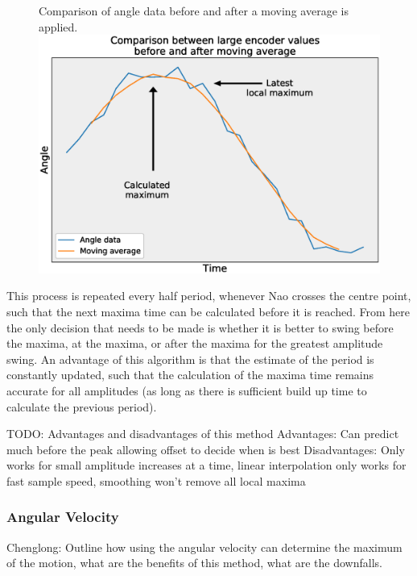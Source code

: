 \documentclass[11pt]{article}
\begin{document}
    \begin{figure}[!htb]
        \centering
        \captionbox
             {Comparison of angle data before and after a moving average is applied.\label{MovingAverageDiagram}}
             {\includegraphics[width=1.0\textwidth]{MovingAverageDiagram.eps}}
    \end{figure}


This process is repeated every half period, whenever Nao crosses the centre point, such that the next maxima time can be calculated before it is reached. From here the only decision that needs to be made is whether it is better to swing before the maxima, at the maxima, or after the maxima for the greatest amplitude swing. An advantage of this algorithm is that the estimate of the period is constantly updated, such that the calculation of the maxima time remains accurate for all amplitudes (as long as there is sufficient build up time to calculate the previous period).

TODO: Advantages and disadvantages of this method
Advantages: Can predict much before the peak allowing offset to decide when is best  
Disadvantages: Only works for small amplitude increases at a time, linear interpolation only works for fast sample speed, smoothing won't remove all local maxima


\subsubsection{Angular Velocity}
Chenglong: Outline how using the angular velocity can determine the maximum of the motion, what are the benefits of this method, what are the downfalls.
\end{document}

